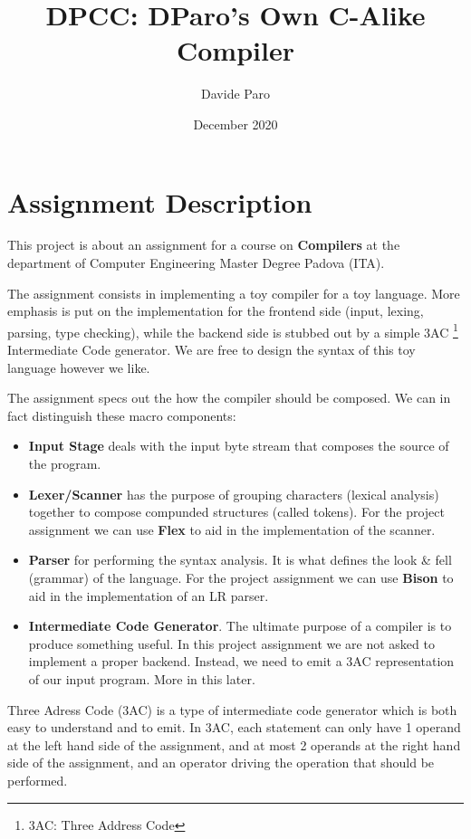 \documentclass[a4paper]{article}
\begin{document}
\tableofcontents


\title{DPCC: DParo's Own C-Alike Compiler}
\author{Davide Paro}
\date{December 2020}

\maketitle

\section{Assignment Description}
This project is about an assignment for a course on \textbf{Compilers}
at the department of Computer Engineering Master Degree Padova (ITA).


The assignment consists in implementing a toy compiler for a toy language. More emphasis
is put on the implementation for the frontend side (input, lexing, parsing, type checking), while
the backend side is stubbed out by a simple 3AC \footnote{3AC: Three Address Code} Intermediate Code
generator.
We are free to design the syntax of this toy language however we like.

The assignment specs out the how the compiler should be composed.
We can in fact distinguish these macro components:

\begin{itemize}
\item \textbf{Input Stage} deals with the input byte stream that composes
    the source of the program.
\item \textbf{Lexer/Scanner} has the purpose of grouping characters (lexical analysis)
    together to compose compunded
    structures (called tokens). For the project assignment we can use \textbf{Flex} to aid in
    the implementation of the scanner.
\item \textbf{Parser} for performing the syntax analysis. It is what defines the look \& fell
    (grammar) of the language. For the project assignment we can use \textbf{Bison} to aid in the
    implementation of an LR parser.
\item \textbf{Intermediate Code Generator}. The ultimate purpose of a compiler is to produce something
    useful. In this project assignment we are not asked to implement a proper backend. Instead,
    we need to emit a 3AC representation of our input program. More in this later.
\end{itemize}

Three Adress Code (3AC) is a type of intermediate code generator which is both easy to understand and to emit.
In 3AC, each statement can only have 1 operand at the left hand side of the assignment, and at most 2 operands at the right hand side
of the assignment, and an operator driving the operation that should be performed.
\end{document}
